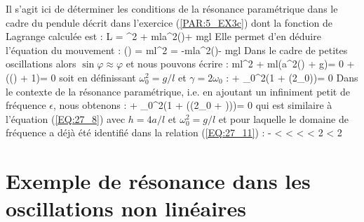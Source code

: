 Il s'agit ici de d\'{e}terminer les conditions de la r\'{e}sonance param\'{e}trique dans le cadre du pendule d\'{e}crit dans l'exercice (\ref{PAR:5_EX3c}) dont la fonction de Lagrange calcul\'{e}e est :
\benn
	L = \dot{\varphi}^{2} + mla\gamma^{2}\cos(\gamma{})\cos\varphi + mgl\cos\varphi
\eenn
Elle permet d'en d\'{e}duire l'\'{e}quation du mouvement :
\benn
	\left(\right) =  \Leftrightarrow ml^{2}\ddot{\varphi} = -mla\gamma^{2}\cos(\gamma{})\sin\varphi - mgl\sin\varphi
\eenn
Dans le cadre de petites oscillations alors $\sin\varphi\approx\varphi$ et nous pouvons \'{e}crire :
\benn
	ml^{2}\ddot{\varphi} + ml\left(a\gamma^{2}\cos(\gamma{}) + g\right)\varphi = 0 \Leftrightarrow \ddot{\varphi} + \left(\cos(\gamma{}) + 1\right)\varphi = 0
\eenn
soit en d\'{e}finissant $\omega_{0}^{2} = g/l$ et $\gamma = 2\omega_{0}$ :
\benn
	\ddot{\varphi} + \omega_{0}^{2}\left(1 + \cos(2\omega_{0})\right)\varphi = 0
\eenn
Dans le contexte de la r\'{e}sonance param\'{e}trique, i.e. en ajoutant un infiniment petit de fr\'{e}quence $\epsilon$, nous obtenons :
\benn
	\ddot{\varphi} + \omega_{0}^{2}\left(1 + \cos((2\omega_{0} + \epsilon))\right)\varphi = 0
\eenn
qui est similaire \`{a} l'\'{e}quation (\ref{EQ:27_8}) avec $h=4a/l$ et $\omega_{0}^{2} = g/l$ et pour laquelle le domaine de fr\'{e}quence a d\'{e}j\`{a} \'{e}t\'{e} identifi\'{e} dans la relation (\ref{EQ:27_11}) :
\benn
	- < \epsilon <   < \epsilon < 2 \Leftrightarrow \lvert\epsilon\rvert < 2
\eenn

\section{Exemple de r\'{e}sonance dans les oscillations non lin\'{e}aires}\label{PAR:29_EX1}

